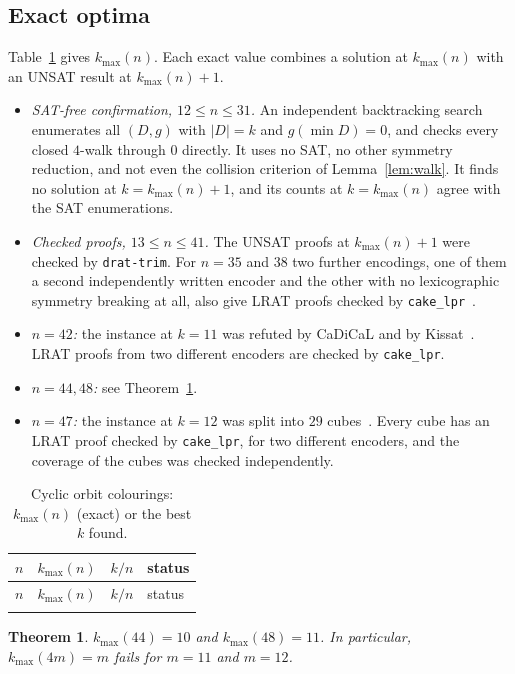 \documentclass[11pt]{amsart}
\newtheorem{theorem}{Theorem}
\theoremstyle{definition}
\newcommand{\kmax}{k_{\max}}
\begin{document}
\subsection{Exact optima}
Table~\ref{tab:cyc} gives $\kmax(n)$. Each exact value combines a solution at $\kmax(n)$
with an UNSAT result at $\kmax(n)+1$.
\begin{itemize}
\item \emph{SAT-free confirmation, $12\le n\le 31$.} An independent backtracking search
  enumerates all $(D,g)$ with $|D|=k$ and $g(\min D)=0$, and checks every closed $4$-walk
  through $0$ directly. It uses no SAT, no other symmetry reduction, and not even the collision
  criterion of Lemma~\ref{lem:walk}. It finds no solution at $k=\kmax(n)+1$, and its counts
  at $k=\kmax(n)$ agree with the SAT enumerations.
\item \emph{Checked proofs, $13\le n\le 41$.} The UNSAT proofs at $\kmax(n)+1$ were checked
  by \texttt{drat-trim}. For $n=35$ and $38$ two further encodings, one of them a second
  independently written encoder and the other with no lexicographic symmetry breaking at
  all, also give LRAT proofs checked by \texttt{cake\_lpr}~\cite{cakelpr}.
\item \emph{$n=42$:} the instance at $k=11$ was refuted by CaDiCaL and by
  Kissat~\cite{Kissat}. LRAT proofs from two different encoders are checked by
  \texttt{cake\_lpr}.
\item \emph{$n=44,48$:} see Theorem~\ref{thm:44}.
\item \emph{$n=47$:} the instance at $k=12$ was split into $29$ cubes~\cite{HKWB11}. Every cube
  has an LRAT proof checked by \texttt{cake\_lpr}, for two different encoders, and the
  coverage of the cubes was checked independently.
\end{itemize}

{\small
\begin{longtable}{rrrl}
\caption{Cyclic orbit colourings: $\kmax(n)$ (exact) or the best $k$ found.}\label{tab:cyc}\\
\toprule
$n$ & $\kmax(n)$ & $k/n$ & status\\
\midrule
\endfirsthead
\toprule
$n$ & $\kmax(n)$ & $k/n$ & status\\
\midrule
\endhead
\bottomrule
\endlastfoot

\end{longtable}
}

\begin{theorem}\label{thm:44}
$\kmax(44)=10$ and $\kmax(48)=11$. In particular, $\kmax(4m)=m$ fails for $m=11$ and $m=12$.
\end{theorem}
\end{document}
